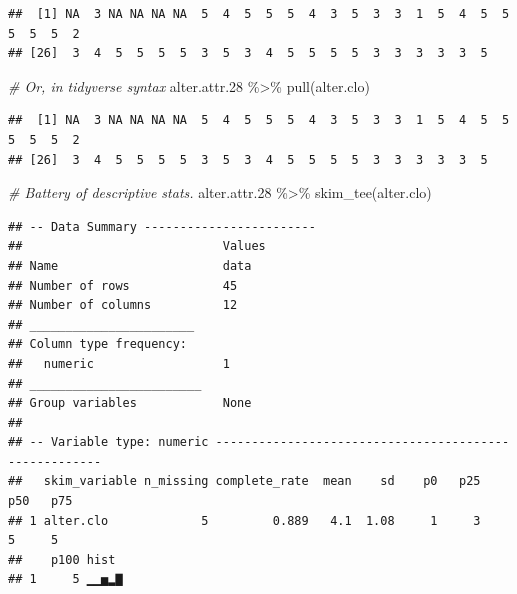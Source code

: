 \documentclass[
]{book}
\newenvironment{Shaded}{\begin{snugshade}}{\end{snugshade}}
\newcommand{\CommentTok}[1]{\textcolor[rgb]{0.56,0.35,0.01}{\textit{#1}}}
\newcommand{\FloatTok}[1]{\textcolor[rgb]{0.00,0.00,0.81}{#1}}
\newcommand{\FunctionTok}[1]{\textcolor[rgb]{0.00,0.00,0.00}{#1}}
\newcommand{\NormalTok}[1]{#1}
\newcommand{\SpecialCharTok}[1]{\textcolor[rgb]{0.00,0.00,0.00}{#1}}
\begin{document}
\begin{Shaded}
\end{Shaded}

\begin{verbatim}
##  [1] NA  3 NA NA NA NA  5  4  5  5  5  4  3  5  3  3  1  5  4  5  5  5  5  5  2
## [26]  3  4  5  5  5  5  3  5  3  4  5  5  5  5  3  3  3  3  3  5
\end{verbatim}

\begin{Shaded}
\begin{Highlighting}[]
\CommentTok{\# Or, in tidyverse syntax}
\NormalTok{alter.attr}\FloatTok{.28} \SpecialCharTok{\%\textgreater{}\%}
  \FunctionTok{pull}\NormalTok{(alter.clo)}
\end{Highlighting}
\end{Shaded}

\begin{verbatim}
##  [1] NA  3 NA NA NA NA  5  4  5  5  5  4  3  5  3  3  1  5  4  5  5  5  5  5  2
## [26]  3  4  5  5  5  5  3  5  3  4  5  5  5  5  3  3  3  3  3  5
\end{verbatim}

\begin{Shaded}
\begin{Highlighting}[]
\CommentTok{\# Battery of descriptive stats.}
\NormalTok{alter.attr}\FloatTok{.28} \SpecialCharTok{\%\textgreater{}\%}
  \FunctionTok{skim\_tee}\NormalTok{(alter.clo) }
\end{Highlighting}
\end{Shaded}

\begin{verbatim}
## -- Data Summary ------------------------
##                            Values
## Name                       data  
## Number of rows             45    
## Number of columns          12    
## _______________________          
## Column type frequency:           
##   numeric                  1     
## ________________________         
## Group variables            None  
## 
## -- Variable type: numeric ------------------------------------------------------
##   skim_variable n_missing complete_rate  mean    sd    p0   p25   p50   p75
## 1 alter.clo             5         0.889   4.1  1.08     1     3     5     5
##    p100 hist 
## 1     5 ▁▁▅▂▇
\end{verbatim}
\end{document}
